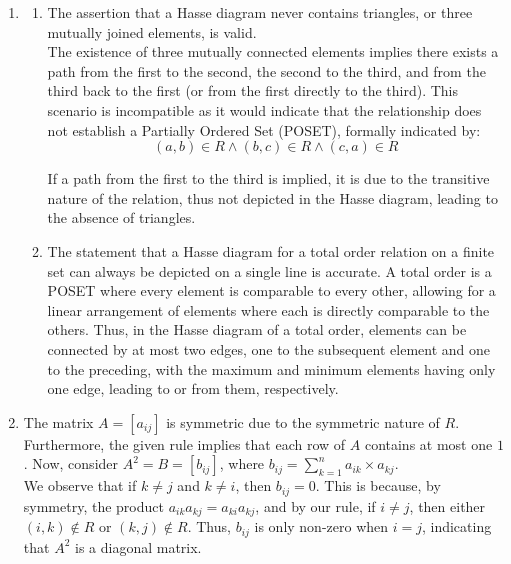 \documentclass[a4paper]{article}
\begin{document}
\begin{enumerate}
    \item \begin{enumerate}
        \item The assertion that a Hasse diagram never contains triangles, or three mutually joined elements, is valid. \\
        
        The existence of three mutually connected elements implies there exists a path from the first to the second, the second to the third, and from the third back to the first (or from the first directly to the third). This scenario is incompatible as it would indicate that the relationship does not establish a Partially Ordered Set (POSET), formally indicated by: \\
         \[(a, b) \in R \land (b, c) \in R \land (c, a) \in R\]
         
        If a path from the first to the third is implied, it is due to the transitive nature of the relation, thus not depicted in the Hasse diagram, leading to the absence of triangles. \\

        \item The statement that a Hasse diagram for a total order relation on a finite set can always be depicted on a single line is accurate. A total order is a POSET where every element is comparable to every other, allowing for a linear arrangement of elements where each is directly comparable to the others. Thus, in the Hasse diagram of a total order, elements can be connected by at most two edges, one to the subsequent element and one to the preceding, with the maximum and minimum elements having only one edge, leading to or from them, respectively.
    \end{enumerate}

    \item The matrix \(A = [a_{ij}]\) is symmetric due to the symmetric nature of \(R\). Furthermore, the given rule implies that each row of \(A\) contains at most one \(1\). Now, consider \(A^2 = B = [b_{ij}]\), where \(b_{ij} = \sum_{k=1}^{n} a_{ik} \times a_{kj}\). \\

    We observe that if \(k \neq j\) and \(k \neq i\), then \(b_{ij} = 0\). This is because, by symmetry, the product \(a_{ik}a_{kj} = a_{ki}a_{kj}\), and by our rule, if \(i \neq j\), then either \((i, k) \notin R\) or \((k, j) \notin R\). Thus, \(b_{ij}\) is only non-zero when \(i = j\), indicating that \(A^2\) is a diagonal matrix.


\end{enumerate}
\end{document}
